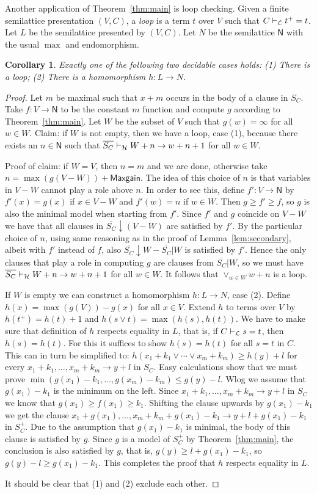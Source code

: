 \documentclass[11pt,a4paper]{article}
\newtheorem{corollary}[theorem]{Corollary}
\newcommand{\N}{\mathsf{N}}
\newcommand\jterm[3]{{{#1_1}+{#2_1}}\vee\cdots\vee{{#1_#3}+{#2_#3}}}
\newcommand\jbody[3]{{{#1_1}+{#2_1}},\ldots,{{#1_#3}+{#2_#3}}}
\newcommand\lathy{{\cal L}}
\newcommand\prvL{\vdash_{\lathy}}
\newcommand\prvH{\vdash_{\cal H}}
\newcommand\M{\mathsf{Maxgain}}
\newcommand\upS[1]{\overline{S_{#1}}}
\begin{document}
Another application of Theorem~\ref{thm:main} is loop checking.
Given a finite semilattice presentation $(V,C)$, a \emph{loop} is a 
term $t$ over $V$ such that $C\prvL t^+=t$. Let $L$ be the
semilattice presented by $(V,C)$. Let $N$ be the semilattice $\N$ with
the usual $\max$ and endomorphism.

\begin{corollary}\label{cor:loopchecking}
Exactly one of the following two decidable cases holds:
(1) There is a loop;
(2) There is a homomorphism $h: L\to N$.
\end{corollary}
\begin{proof}
Let $m$ be maximal such that $x+m$ occurs in the body of a clause in $S_C$.
Take $f: V\to\N$ to be the constant $m$ function and compute $g$ according
to Theorem~\ref{thm:main}. Let $W$ be the subset of $V$ such that 
$g(w)=\infty$ for all $w\in W$. Claim: if $W$ is not empty,
then we have a loop, case (1), because there exists an $n\in\N$ such that 
$\upS{C}\prvH W+n \to w+n+1$ for all $w\in W$.

Proof of claim: if $W=V$, then $n=m$ and we are done,
otherwise take $n= \max(g(V-W))+\M$. The idea of this choice of $n$ is 
that variables in $V-W$ cannot play a role above $n$.
In order to see this, define $f': V\to\N$ by $f'(x)=g(x)$ if $x\in V-W$
and $f'(w)=n$ if $w\in W$. Then $g\geq f'\geq f$, so $g$ is also the minimal 
model when starting from $f'$. Since $f'$ and $g$ coincide on $V-W$ we have
that all clauses in $\upS{C}{\downarrow}(V-W)$ are satisfied by $f'$.
By the particular choice of $n$, using same reasoning as in the proof of 
Lemma~\ref{lem:secondary}, albeit with $f'$ instead of $f$, also
$\upS{C}{\downarrow}W - \upS{C}|W$ is satisfied by $f'$.
Hence the only clauses that play a role in computing $g$ are
clauses from $\upS{C}|W$, so we must have 
$\upS{C}\prvH W+n \to w+n+1$ for all $w\in W$.
It follows that $\vee_{w\in W} w+n$ is a loop.

If $W$ is empty we can construct a homomorphism $h: L\to N$, case (2).
Define $h(x) = \max(g(V))- g(x)$ for all $x\in V$. 
Extend $h$ to terms over $V$ by $h(t^+) = h(t)+1$ 
and $h(s\vee t) = \max(h(s),h(t))$.
We have to make sure that definition of $h$ respects
equality in $L$, that is, if $C\prvL s=t$, then $h(s)=h(t)$.
For this it suffices to show $h(s)=h(t)$ for all $s=t$ in $C$.
This can in turn be simplified to: $h(\jterm{x}{k}{m}) \geq h(y)+l$ 
for every $\jbody{x}{k}{m} \to y+l$ in $S_C$.
Easy calculations show that we must prove
$\min(g(x_1)-k_1,\ldots,g(x_m)-k_m) \leq g(y)-l$.
Wlog we assume that $g(x_1)-k_1$ is the minimum on the left.
Since $\jbody{x}{k}{m} \to y+l$ in $S_C$ we know 
that $g(x_1)\geq f(x_1)\geq k_1$. Shifting the clause
upwards by $g(x_1)-k_1$ we get the clause
$x_1+g(x_1),\ldots,x_m+k_m+g(x_1)-k_1 \to y+l+g(x_1)-k_1$
in $S_C^+$. Due to the assumption that $g(x_1)-k_1$ is minimal,
the body of this clause is satisfied by $g$.
Since $g$ is a model of $S_C^+$ by Theorem~\ref{thm:main},
the conclusion is also satisfied by $g$, that is,
$g(y)\geq l+g(x_1)-k_1$, so $g(y)-l\geq g(x_1)-k_1$.
This completes the proof that $h$ respects equality in $L$.

It should be clear that (1) and (2) exclude each other.
\end{proof}
\end{document}
